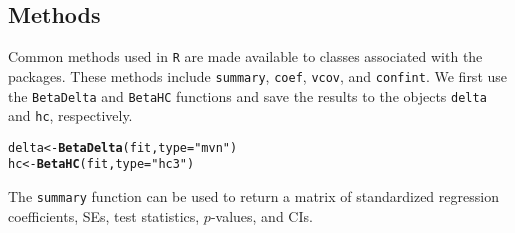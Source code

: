 \documentclass[man]{apa7}\usepackage[]{graphicx}\usepackage[]{xcolor}
\makeatletter
\newcommand{\hlstr}[1]{\textcolor[rgb]{0.192,0.494,0.8}{#1}}%
\newcommand{\hlstd}[1]{\textcolor[rgb]{0.345,0.345,0.345}{#1}}%
\newcommand{\hlkwb}[1]{\textcolor[rgb]{0.69,0.353,0.396}{#1}}%
\newcommand{\hlkwc}[1]{\textcolor[rgb]{0.333,0.667,0.333}{#1}}%
\newcommand{\hlkwd}[1]{\textcolor[rgb]{0.737,0.353,0.396}{\textbf{#1}}}%
\newenvironment{kframe}{%
 \def\at@end@of@kframe{}%
 \ifinner\ifhmode%
  \def\at@end@of@kframe{\end{minipage}}%
  \begin{minipage}{\columnwidth}%
 \fi\fi%
 \def\FrameCommand##1{\hskip\@totalleftmargin \hskip-\fboxsep
 \colorbox{shadecolor}{##1}\hskip-\fboxsep
     \hskip-\linewidth \hskip-\@totalleftmargin \hskip\columnwidth}%
 \MakeFramed {\advance\hsize-\width
   \@totalleftmargin\z@ \linewidth\hsize
   \@setminipage}}%
 {\par\unskip\endMakeFramed%
 \at@end@of@kframe}
\newenvironment{knitrout}{}{} %
\makeatother
\begin{document}
\subsection{Methods}

Common methods used in \texttt{R} are made available
to classes associated with the packages.
These methods include
\texttt{summary},
\texttt{coef},
\texttt{vcov}, and
\texttt{confint}.
We first use the
\texttt{BetaDelta}
and
\texttt{BetaHC}
functions and save the results to the objects
\texttt{delta}
and
\texttt{hc},
respectively.

\vspace{-.5em}
\begin{minipage}{.75\linewidth}
	\singlespacing
\begin{knitrout}\scriptsize
{}\color{fgcolor}\begin{kframe}
\begin{alltt}
\hlstd{delta} \hlkwb{<-} \hlkwd{BetaDelta}\hlstd{(fit,} \hlkwc{type} \hlstd{=} \hlstr{"mvn"}\hlstd{)}
\hlstd{hc} \hlkwb{<-} \hlkwd{BetaHC}\hlstd{(fit,} \hlkwc{type} \hlstd{=} \hlstr{"hc3"}\hlstd{)}
\end{alltt}
\end{kframe}
\end{knitrout}
\end{minipage}

\noindent The \texttt{summary} function can be used to return
a matrix of standardized regression coefficients,
SEs,
test statistics,
$p$-values,
and CIs.
\end{document}
